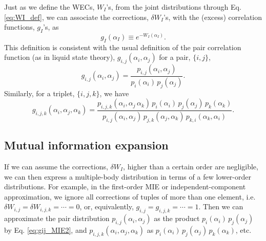 \documentclass[preprint, superscriptaddress]{revtex4-1}
\begin{document}


Just as we define the WECs, $W_I$'s, from the joint distributions
through Eq. \eqref{eq:WI_def},
we can associate the corrections, $\delta W_I$'s,
with the (excess) correlation functions, $g_I$'s, as
%
\begin{equation}
  g_I(\alpha_I) \equiv e^{-W_I(\alpha_I)}
  .
  \label{eq:gI_def}
\end{equation}
%
This definition is consistent with the usual definition
of the pair correlation function (as in liquid state theory\cite{hansen}),
$g_{i,j}(\alpha_i, \alpha_j)$ for a pair, $\{i, j\}$,
\begin{equation}
  g_{i,j}(\alpha_i, \alpha_j)
  =
  \frac{ p_{i,j}(\alpha_i, \alpha_j) } { p_i(\alpha_i) \, p_j(\alpha_j) }
  .
  \label{eq:gij_MIE2}
\end{equation}
Similarly, for a triplet, $\{i, j, k\}$, we have
$$
g_{i,j,k}(\alpha_i, \alpha_j, \alpha_k)
=
\frac{ p_{i,j,k}(\alpha_i, \alpha_j \, \alpha_k) \, p_i(\alpha_i) \, p_j(\alpha_j) \, p_k(\alpha_k) }{ p_{i,j}(\alpha_i, \alpha_j) \, p_{j,k}(\alpha_j, \alpha_k) \, p_{k,i}(\alpha_k, \alpha_i) }
.
$$


\subsection{Mutual information expansion}

If we can assume the corrections, $\delta W_I$, higher than a certain order are negligible,
we can then express a multiple-body distribution
in terms of a few lower-order distributions.
%
For example, in the first-order MIE or independent-component approximation,
we ignore all corrections of tuples of more than one element,
i.e. $\delta W_{i, j} = \delta W_{i,j,k} = \cdots = 0$,
or, equivalently,
$g_{i,j} = g_{i,j,k} = \cdots = 1$.
%
Then we can approximate the pair distribution
$p_{i,j}(\alpha_i, \alpha_j)$
as the product $p_i(\alpha_i) \, p_j(\alpha_j)$
by Eq. \eqref{eq:gij_MIE2},
and
$p_{i,j,k}(\alpha_i, \alpha_j, \alpha_k)$
as
$p_i(\alpha_i) \, p_j(\alpha_j) \, p_k(\alpha_k)$, etc.
\end{document}
